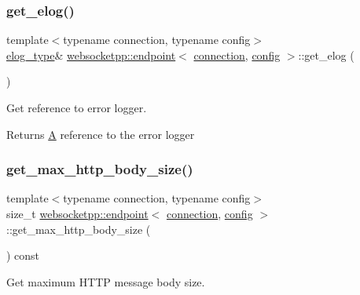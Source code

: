 \subsubsection{\texorpdfstring{get\+\_\+elog()}{get\_elog()}}
{\footnotesize\ttfamily template$<$typename connection, typename config$>$ \\
\mbox{\hyperlink{classwebsocketpp_1_1endpoint_a4ab98f4fed5b5b2740105eff732c7b1e}{elog\+\_\+type}}\& \mbox{\hyperlink{classwebsocketpp_1_1endpoint}{websocketpp\+::endpoint}}$<$ \mbox{\hyperlink{classwebsocketpp_1_1connection}{connection}}, \mbox{\hyperlink{classconfig}{config}} $>$\+::get\+\_\+elog (\begin{DoxyParamCaption}{ }\end{DoxyParamCaption})\hspace{0.3cm}{\ttfamily [inline]}}



Get reference to error logger. 

\begin{DoxyReturn}{Returns}
\mbox{\hyperlink{struct_a}{A}} reference to the error logger 
\end{DoxyReturn}
\mbox{\label{classwebsocketpp_1_1endpoint_ace4f1bdfdf20c13557b34c35c10ca554}} 
\subsubsection{\texorpdfstring{get\+\_\+max\+\_\+http\+\_\+body\+\_\+size()}{get\_max\_http\_body\_size()}}
{\footnotesize\ttfamily template$<$typename connection, typename config$>$ \\
size\+\_\+t \mbox{\hyperlink{classwebsocketpp_1_1endpoint}{websocketpp\+::endpoint}}$<$ \mbox{\hyperlink{classwebsocketpp_1_1connection}{connection}}, \mbox{\hyperlink{classconfig}{config}} $>$\+::get\+\_\+max\+\_\+http\+\_\+body\+\_\+size (\begin{DoxyParamCaption}{ }\end{DoxyParamCaption}) const\hspace{0.3cm}{\ttfamily [inline]}}



Get maximum H\+T\+TP message body size. 

